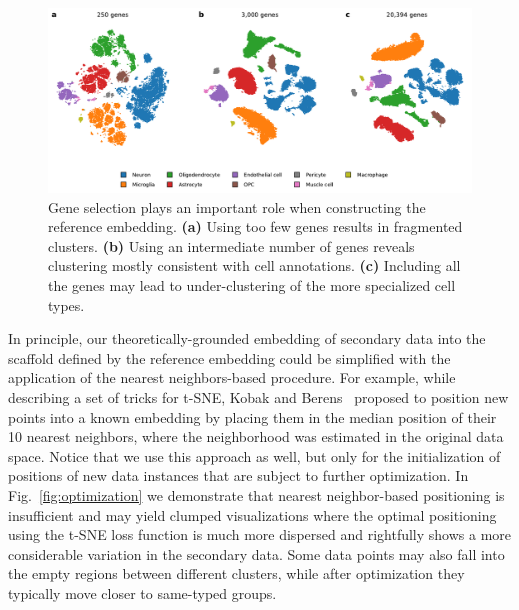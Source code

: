 \documentclass[runningheads]{llncs}
\begin{document}
\begin{figure}[htbp]
\includegraphics[width=\textwidth]{figures/hrvatin_embedding_tsne_genes.pdf}
\caption{Gene selection plays an important role when constructing the reference
embedding. {\bf (a)} Using too few genes results in fragmented clusters. {\bf (b)}
Using an intermediate number of genes reveals clustering mostly consistent with
cell annotations. {\bf (c)} Including all the genes may lead to
under-clustering of the more specialized cell types.}
\label{fig:gene_selection}
\end{figure}

In principle, our theoretically-grounded embedding of secondary data into the
scaffold defined by the reference embedding could be simplified with the
application of the nearest neighbors-based procedure. For example, while
describing a set of tricks for t-SNE, Kobak and Berens~\cite{art_of_using_tsne}
proposed to position new points into a known embedding by placing them in the
median position of their 10 nearest neighbors, where the neighborhood was
estimated in the original data space. Notice that we use this approach as well,
but only for the initialization of positions of new data instances that are subject
to further optimization. In Fig.~\ref{fig:optimization} we demonstrate that
nearest neighbor-based positioning is insufficient and may yield clumped
visualizations where the optimal positioning using the t-SNE loss function is
much more dispersed and rightfully shows a more considerable variation in the
secondary data. Some data points may also fall into the empty regions
between different clusters, while after optimization they typically
move closer to same-typed groups.
\end{document}
